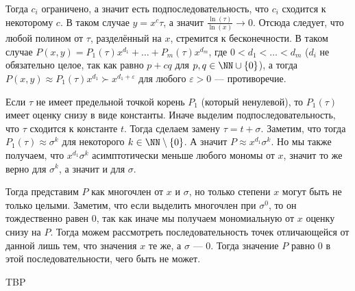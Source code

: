 \documentclass[12pt,a4paper]{article}
\begin{document}
\begin{problem}{12}
        Тогда $c_i$ ограничено, а значит есть подпоследовательность, что $c_i$ сходится к некоторому $c$. В таком случае $y = x^c \tau$, а значит $\frac{\ln(\tau)}{\ln(x)}\to 0$. Отсюда следует, что любой полином от $\tau$, разделённый на $x$, стремится к бесконечности. В таком случае $P(x, y) = P_1(\tau)x^{d_1} + \dots + P_m(\tau)x^{d_m}$, где $0 < d_1 < \dots < d_m$ ($d_i$ не обязательно целое, так как равно $p + cq$ для $p, q \in \NN \cup \{0\}$), а тогда $P(x, y) \approx P_1(\tau)x^{d_1} \succ x^{d_1+\varepsilon}$ для любого $\varepsilon > 0$ --- противоречие.

        Если $\tau$ не имеет предельной точкой корень $P_1$ (который ненулевой), то $P_1(\tau)$ имеет оценку снизу в виде константы. Иначе выделим подпоследовательность, что $\tau$ сходится к константе $t$. Тогда сделаем замену $\tau = t + \sigma$. Заметим, что тогда $P_1(\tau) \approx \sigma^k$ для некоторого $k \in \NN\setminus\{0\}$. А значит $P \approx x^{d_1} \sigma^k$. Но мы также получаем, что $x^{d_1} \sigma^k$ асимптотически меньше любого мономы от $x$, значит то же верно для $\sigma^k$, а значит и для $\sigma$.

        Тогда представим $P$ как многочлен от $x$ и $\sigma$, но только степени $x$ могут быть не только целыми. Заметим, что если выделить многочлен при $\sigma^0$, то он тождественно равен $0$, так как иначе мы получаем мономиальную от $x$ оценку снизу на $P$. Тогда можем рассмотреть последовательность точек отличающейся от данной лишь тем, что значения $x$ те же, а $\sigma$ --- $0$. Тогда значение $P$ равно $0$ в этой последовательности, чего быть не может.
    \end{problem}

    \begin{enumproblem}
        TBP
    \end{enumproblem}
\end{document}
